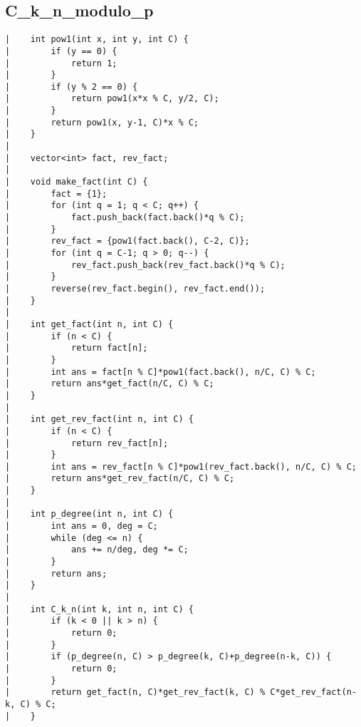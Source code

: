 \documentclass[a4paper, 10pt]{article}
\begin{document}
\begin{center}
\section*{C\_k\_n\_modulo\_p}
\begin{verbatim}
|    int pow1(int x, int y, int C) {
|        if (y == 0) {
|            return 1;
|        }
|        if (y % 2 == 0) {
|            return pow1(x*x % C, y/2, C);
|        }
|        return pow1(x, y-1, C)*x % C;
|    }
|    
|    vector<int> fact, rev_fact;
|    
|    void make_fact(int C) {
|        fact = {1};
|        for (int q = 1; q < C; q++) {
|            fact.push_back(fact.back()*q % C);
|        }
|        rev_fact = {pow1(fact.back(), C-2, C)};
|        for (int q = C-1; q > 0; q--) {
|            rev_fact.push_back(rev_fact.back()*q % C);
|        }
|        reverse(rev_fact.begin(), rev_fact.end());
|    }
|    
|    int get_fact(int n, int C) {
|        if (n < C) {
|            return fact[n];
|        }
|        int ans = fact[n % C]*pow1(fact.back(), n/C, C) % C;
|        return ans*get_fact(n/C, C) % C;
|    }
|    
|    int get_rev_fact(int n, int C) {
|        if (n < C) {
|            return rev_fact[n];
|        }
|        int ans = rev_fact[n % C]*pow1(rev_fact.back(), n/C, C) % C;
|        return ans*get_rev_fact(n/C, C) % C;
|    }
|    
|    int p_degree(int n, int C) {
|        int ans = 0, deg = C;
|        while (deg <= n) {
|            ans += n/deg, deg *= C;
|        }
|        return ans;
|    }
|    
|    int C_k_n(int k, int n, int C) {
|        if (k < 0 || k > n) {
|            return 0;
|        }
|        if (p_degree(n, C) > p_degree(k, C)+p_degree(n-k, C)) {
|            return 0;
|        }
|        return get_fact(n, C)*get_rev_fact(k, C) % C*get_rev_fact(n-k, C) % C;
|    }
\end{verbatim}


\end{center}
\end{document}
